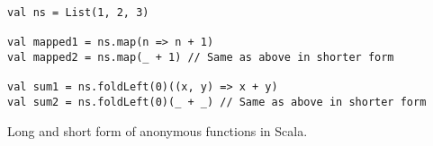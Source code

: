 \begin{algorithm}
\begin{verbatim}
val ns = List(1, 2, 3)

val mapped1 = ns.map(n => n + 1)
val mapped2 = ns.map(_ + 1) // Same as above in shorter form

val sum1 = ns.foldLeft(0)((x, y) => x + y)
val sum2 = ns.foldLeft(0)(_ + _) // Same as above in shorter form
\end{verbatim}

\caption{Long and short form of anonymous functions in Scala. \label{scala:lambdas}}
\end{algorithm}